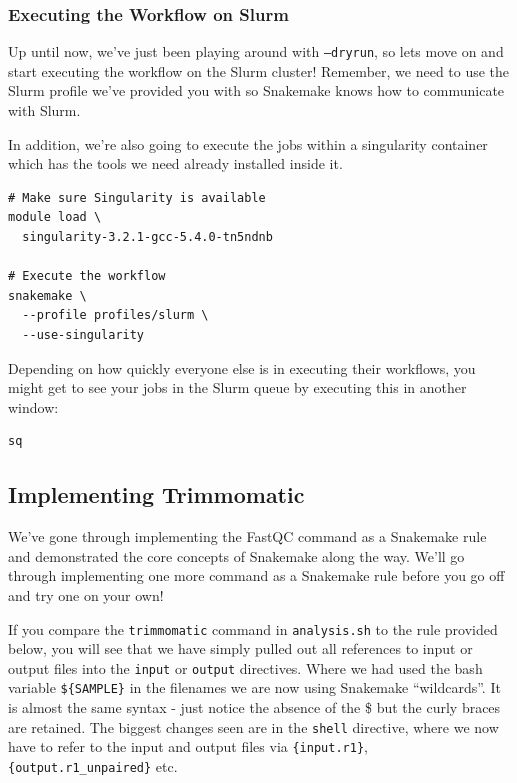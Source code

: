 \subsubsection{Executing the Workflow on Slurm}

Up until now, we've just been playing around with \texttt{--dryrun}, so lets move on and start executing the workflow on the Slurm cluster!
Remember, we need to use the Slurm profile we've provided you with so Snakemake knows how to communicate with Slurm.

In addition, we're also going to execute the jobs within a singularity container which has the tools we need already installed inside it.

\begin{lstlisting}
# Make sure Singularity is available
module load \
  singularity-3.2.1-gcc-5.4.0-tn5ndnb

# Execute the workflow
snakemake \
  --profile profiles/slurm \
  --use-singularity
\end{lstlisting}

Depending on how quickly everyone else is in executing their workflows, you might get to see your jobs in the Slurm queue by executing this in another window:

\begin{lstlisting}
sq
\end{lstlisting}

\subsection{Implementing Trimmomatic}

We've gone through implementing the FastQC command as a Snakemake rule and demonstrated the core concepts of
Snakemake along the way. We'll go through implementing one more command as a Snakemake rule before you go
off and try one on your own!

If you compare the \texttt{trimmomatic} command in \texttt{analysis.sh} to the rule provided below, you will
see that we have simply pulled out all references to input or output files into the \texttt{input} or
\texttt{output} directives. Where we had used the bash variable \texttt{\$\{SAMPLE\}} in the filenames we are now
using Snakemake ``wildcards''. It is almost the same syntax - just notice the absence of the \$ but the curly braces
are retained. The biggest changes seen are in the \texttt{shell} directive, where we now have to refer to the input
and output files via \texttt{\{input.r1\}}, \texttt{\{output.r1\_unpaired\}} etc.

